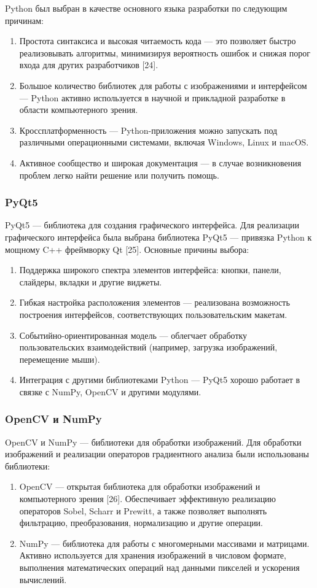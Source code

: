 Python был выбран в качестве основного языка разработки по следующим причинам:
\begin{enumerate}
	\item Простота синтаксиса и высокая читаемость кода — это позволяет быстро реализовывать алгоритмы, минимизируя вероятность ошибок и снижая порог входа для других разработчиков [24].
	\item Большое количество библиотек для работы с изображениями и интерфейсом — Python активно используется в научной и прикладной разработке в области компьютерного зрения.
	\item Кроссплатформенность — Python-приложения можно запускать под различными операционными системами, включая Windows, Linux и macOS.
	\item Активное сообщество и широкая документация — в случае возникновения проблем легко найти решение или получить помощь.
\end{enumerate}
\subsubsection{PyQt5}

PyQt5 — библиотека для создания графического интерфейса. Для реализации графического интерфейса была выбрана библиотека PyQt5 — привязка Python к мощному C++ фреймворку Qt [25]. Основные причины выбора:
\begin{enumerate}
	\item Поддержка широкого спектра элементов интерфейса: кнопки, панели, слайдеры, вкладки и другие виджеты.
	\item Гибкая настройка расположения элементов — реализована возможность построения интерфейсов, соответствующих пользовательским макетам.
	\item Событийно-ориентированная модель — облегчает обработку пользовательских взаимодействий (например, загрузка изображений, перемещение мыши).
	\item Интеграция с другими библиотеками Python — PyQt5 хорошо работает в связке с NumPy, OpenCV и другими модулями.
\end{enumerate}
\subsubsection{OpenCV и NumPy}

OpenCV и NumPy — библиотеки для обработки изображений. Для обработки изображений и реализации операторов градиентного анализа были использованы библиотеки:
\begin{enumerate}
	\item OpenCV — открытая библиотека для обработки изображений и компьютерного зрения [26]. Обеспечивает эффективную реализацию операторов Sobel, Scharr и Prewitt, а также позволяет выполнять фильтрацию, преобразования, нормализацию и другие операции.
	\item NumPy — библиотека для работы с многомерными массивами и матрицами. Активно используется для хранения изображений в числовом формате, выполнения математических операций над данными пикселей и ускорения вычислений.
\end{enumerate}
